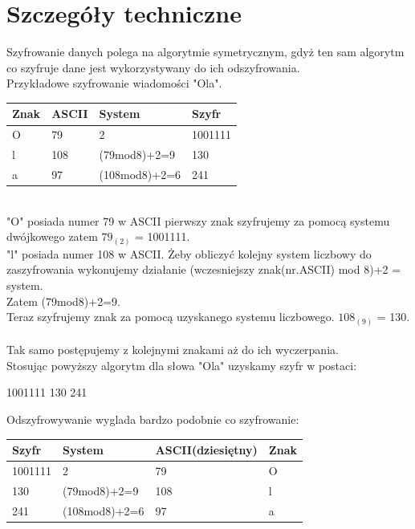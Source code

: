 \documentclass{article}
\begin{document}
\cleardoublepage

\section{Szczegóły techniczne}

Szyfrowanie danych polega na algorytmie symetrycznym, gdyż ten sam algorytm co szyfruje dane jest wykorzystywany do ich odszyfrowania.\\

Przykładowe szyfrowanie wiadomości "Ola".\\

\begin{tabular}{|l|l|l|l|} \hline
Znak & ASCII & System & Szyfr\\
\hline \hline
O & 79 & 2 & 1001111\\
\hline \hline
l & 108 & (79mod8)+2=9 & 130\\ \hline
\hline \hline
a & 97 & (108mod8)+2=6 & 241\\ \hline
\end{tabular}\\

"O" posiada numer 79 w ASCII pierwszy znak szyfrujemy za pomocą systemu dwójkowego zatem $79_{(2)}$ = 1001111.\\

"l" posiada numer 108 w ASCII.
Żeby obliczyć kolejny system liczbowy do zaszyfrowania wykonujemy działanie (wczesniejszy znak(nr.ASCII) mod 8)+2 = system.\\
Zatem (79mod8)+2=9.\\
Teraz szyfrujemy znak za pomocą uzyskanego systemu liczbowego.
$108_{(9)}$ = 130.\\\\
Tak samo postępujemy z kolejnymi znakami aż do ich wyczerpania.\\


Stosując powyższy algorytm dla słowa "Ola" uzyskamy szyfr w postaci:
\begin{center}
1001111 130 241\\
\end{center}

Odszyfrowywanie wyglada bardzo podobnie co szyfrowanie:\\

\begin{tabular}{|l|l|l|l|} \hline
Szyfr & System & ASCII(dziesiętny) & Znak\\
\hline \hline
1001111 & 2 & 79 & O\\
\hline \hline
130 & (79mod8)+2=9 & 108 & l\\ \hline
\hline \hline
241 & (108mod8)+2=6 & 97 & a\\ \hline
\end{tabular}\\
\end{document}
